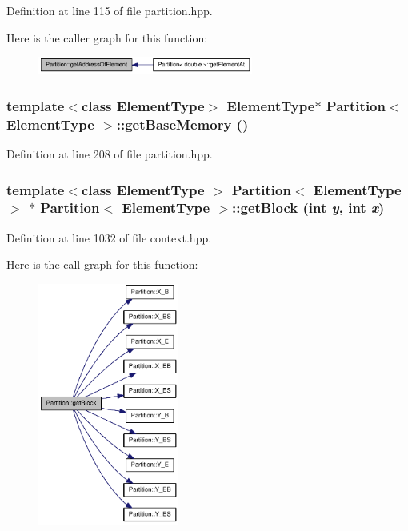 Definition at line 115 of file partition.hpp.

Here is the caller graph for this function:\nopagebreak
\begin{figure}[H]
\begin{center}
\leavevmode
\includegraphics[width=200pt]{class_partition_a3866b3ab8d6e114eb0835465f7418ceb_icgraph}
\end{center}
\end{figure}
\hypertarget{class_partition_a09cdb296f21b866f576556e0b7d5c85b}{
\subsubsection[{getBaseMemory}]{\setlength{\rightskip}{0pt plus 5cm}template$<$class ElementType$>$ ElementType$\ast$ {\bf Partition}$<$ ElementType $>$::getBaseMemory ()}}
\label{class_partition_a09cdb296f21b866f576556e0b7d5c85b}


Definition at line 208 of file partition.hpp.\hypertarget{class_partition_ac675bc154e0d7fb01bf9db46196165ba}{
\subsubsection[{getBlock}]{\setlength{\rightskip}{0pt plus 5cm}template$<$class ElementType $>$ {\bf Partition}$<$ ElementType $>$ $\ast$ {\bf Partition}$<$ ElementType $>$::getBlock (int {\em y}, \/  int {\em x})}}
\label{class_partition_ac675bc154e0d7fb01bf9db46196165ba}


Definition at line 1032 of file context.hpp.

Here is the call graph for this function:\nopagebreak
\begin{figure}[H]
\begin{center}
\leavevmode
\includegraphics[width=131pt]{class_partition_ac675bc154e0d7fb01bf9db46196165ba_cgraph}
\end{center}
\end{figure}



